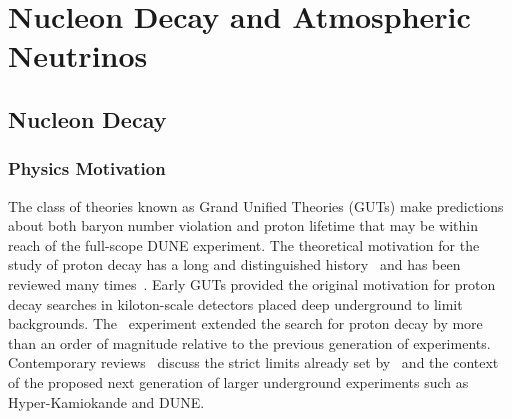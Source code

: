 \chapter{Nucleon Decay and Atmospheric Neutrinos}
\label{ch:physics-atmpdk}

\section{Nucleon Decay}
\label{sec:physics-atmpdk-ndk}

\subsection{Physics Motivation}
	The class of theories known as Grand Unified Theories (GUTs) make
predictions about both baryon number violation and  proton lifetime that may be
within reach of the full-scope DUNE experiment. 
%
The theoretical motivation for the study of proton decay has a long and
distinguished history~\cite{Pati:1973rp,Georgi:1974sy,Dimopoulos:1981dw} and
has been reviewed many times~\cite{Langacker:1980js,deBoer:1994dg,Nath:2006ut}.
%
Early GUTs provided the original motivation for proton decay searches in
kiloton-scale detectors placed deep underground to limit backgrounds.  The
 \superk\ experiment extended the search for proton decay by more
than an order of magnitude relative to the previous generation of experiments.
%
Contemporary reviews~\cite{Raby:2008pd,Senjanovic:2009kr,Li:2010dp} discuss the
strict limits already set by \superk\ and the context of the proposed next
generation of larger underground
experiments such as Hyper-Kamiokande and DUNE.

